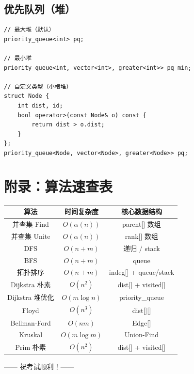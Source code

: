 \documentclass[12pt,a4paper]{article}
\begin{document}
\subsection{优先队列（堆）}

\begin{lstlisting}[caption={priority\_queue 用法}]
// 最大堆（默认）
priority_queue<int> pq;

// 最小堆
priority_queue<int, vector<int>, greater<int>> pq_min;

// 自定义类型（小根堆）
struct Node {
    int dist, id;
    bool operator>(const Node& o) const {
        return dist > o.dist;
    }
};
priority_queue<Node, vector<Node>, greater<Node>> pq;
\end{lstlisting}

\newpage

\section*{附录：算法速查表}

\begin{center}
\begin{tabular}{|c|c|c|}
\hline
\textbf{算法} & \textbf{时间复杂度} & \textbf{核心数据结构} \\
\hline
并查集 Find & $O(\alpha(n))$ & parent[] 数组 \\
\hline
并查集 Unite & $O(\alpha(n))$ & rank[] 数组 \\
\hline
DFS & $O(n + m)$ & 递归 / stack \\
\hline
BFS & $O(n + m)$ & queue \\
\hline
拓扑排序 & $O(n + m)$ & indeg[] + queue/stack \\
\hline
Dijkstra 朴素 & $O(n^2)$ & dist[] + visited[] \\
\hline
Dijkstra 堆优化 & $O(m\log n)$ & priority\_queue \\
\hline
Floyd & $O(n^3)$ & dist[][] \\
\hline
Bellman-Ford & $O(nm)$ & Edge[] \\
\hline
Kruskal & $O(m\log m)$ & Union-Find \\
\hline
Prim 朴素 & $O(n^2)$ & dist[] + visited[] \\
\hline
\end{tabular}
\end{center}

\vfill
\begin{flushright}
\small —— 祝考试顺利！——
\end{flushright}
\end{document}
